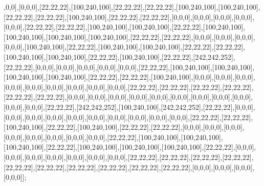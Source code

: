,0,0],[0,0,0],[22,22,22],[100,240,100],[22,22,22],[22,22,22],[100,240,100],[100,240,100],[22,22,22],[22,22,22],[100,240,100],[22,22,22],[22,22,22],[0,0,0],[0,0,0],[0,0,0],[0,0,0],[0,0,0],[22,22,22],[22,22,22],[100,240,100],[100,240,100],[22,22,22],[100,240,100],[100,240,100],[100,240,100],[100,240,100],[22,22,22],[22,22,22],[0,0,0],[0,0,0],[0,0,0],[0,0,0],[100,240,100],[22,22,22],[100,240,100],[100,240,100],[22,22,22],[22,22,22],[100,240,100],[100,240,100],[22,22,22],[100,240,100],[22,22,22],[242,242,252],[22,22,22],[0,0,0],[0,0,0],[0,0,0],[0,0,0],[0,0,0],[22,22,22],[100,240,100],[100,240,100],[100,240,100],[100,240,100],[22,22,22],[22,22,22],[100,240,100],[0,0,0],[0,0,0],[0,0,0],[0,0,0],[0,0,0],[0,0,0],[0,0,0],[0,0,0],[0,0,0],[22,22,22],[22,22,22],[22,22,22],[22,22,22],[22,22,22],[22,22,22],[0,0,0],[0,0,0],[0,0,0],[0,0,0],[0,0,0],[0,0,0],[0,0,0],[0,0,0],[0,0,0],[0,0,0],[0,0,0],[22,22,22],[242,242,252],[100,240,100],[242,242,252],[22,22,22],[0,0,0],[0,0,0],[0,0,0],[0,0,0],[0,0,0],[0,0,0],[0,0,0],[0,0,0],[0,0,0],[0,0,0],[22,22,22],[22,22,22],[100,240,100],[22,22,22],[100,240,100],[22,22,22],[22,22,22],[0,0,0],[0,0,0],[0,0,0],[0,0,0],[0,0,0],[0,0,0],[0,0,0],[0,0,0],[22,22,22],[100,240,100],[100,240,100],[100,240,100],[22,22,22],[100,240,100],[100,240,100],[100,240,100],[22,22,22],[0,0,0],[0,0,0],[0,0,0],[0,0,0],[0,0,0],[0,0,0],[0,0,0],[22,22,22],[22,22,22],[22,22,22],[22,22,22],[22,22,22],[22,22,22],[22,22,22],[22,22,22],[22,22,22],[22,22,22],[0,0,0],[0,0,0],[0,0,0],[0,0,0]];

